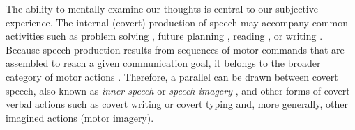 \documentclass[utf8]{template/frontiersSCNS} %
\begin{document}
The ability to mentally examine our thoughts is central to our subjective experience. The internal (covert) production of speech may accompany common activities such as problem solving \citep{baldo_is_2005, sokolov_inner_1972}, future planning \citep{dargembeau_frequency_2011}, reading \citep[e.g.,][]{loevenbruck_left_2005, perrone-bertolotti_how_2012}, or writing \citep{frith_reading_1979}. Because speech production results from sequences of motor commands that are assembled to reach a given communication goal, it belongs to the broader category of motor actions \citep{jeannerod_motor_2006}. Therefore, a parallel can be drawn between covert speech, also known as \textit{inner speech} or \textit{speech imagery} \citep[for reviews, see][]{alderson-day_inner_2015, perrone-bertolotti_what_2014, loevenbruck_cognitive_2018}, and other forms of covert verbal actions such as covert writing or covert typing and, more generally, other imagined actions (motor imagery).

\end{document}
